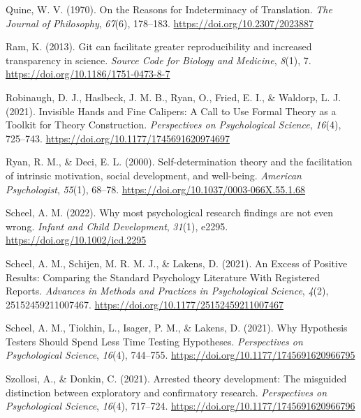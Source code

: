 \documentclass[
  man, noextraspace,floatsintext]{apa6}
\newlength{\cslhangindent}
\newenvironment{CSLReferences}[2] %
 {\begin{list}{}{%
  \setlength{\itemindent}{0pt}
  \setlength{\leftmargin}{0pt}
  \setlength{\parsep}{0pt}
  \ifodd #1
   \setlength{\leftmargin}{\cslhangindent}
   \setlength{\itemindent}{-1\cslhangindent}
  \fi
  \setlength{\itemsep}{#2\baselineskip}}}
 {\end{list}}
\begin{document}
\begin{CSLReferences}{1}{0}
Quine, W. V. (1970). On the {Reasons} for {Indeterminacy} of {Translation}. \emph{The Journal of Philosophy}, \emph{67}(6), 178--183. \url{https://doi.org/10.2307/2023887}

Ram, K. (2013). Git can facilitate greater reproducibility and increased transparency in science. \emph{Source Code for Biology and Medicine}, \emph{8}(1), 7. \url{https://doi.org/10.1186/1751-0473-8-7}

Robinaugh, D. J., Haslbeck, J. M. B., Ryan, O., Fried, E. I., \& Waldorp, L. J. (2021). Invisible {Hands} and {Fine Calipers}: {A Call} to {Use Formal Theory} as a {Toolkit} for {Theory Construction}. \emph{Perspectives on Psychological Science}, \emph{16}(4), 725--743. \url{https://doi.org/10.1177/1745691620974697}

Ryan, R. M., \& Deci, E. L. (2000). Self-determination theory and the facilitation of intrinsic motivation, social development, and well-being. \emph{American Psychologist}, \emph{55}(1), 68--78. \url{https://doi.org/10.1037/0003-066X.55.1.68}

Scheel, A. M. (2022). Why most psychological research findings are not even wrong. \emph{Infant and Child Development}, \emph{31}(1), e2295. \url{https://doi.org/10.1002/icd.2295}

Scheel, A. M., Schijen, M. R. M. J., \& Lakens, D. (2021). An {Excess} of {Positive Results}: {Comparing} the {Standard Psychology Literature With Registered Reports}. \emph{Advances in Methods and Practices in Psychological Science}, \emph{4}(2), 25152459211007467. \url{https://doi.org/10.1177/25152459211007467}

Scheel, A. M., Tiokhin, L., Isager, P. M., \& Lakens, D. (2021). Why {Hypothesis Testers Should Spend Less Time Testing Hypotheses}. \emph{Perspectives on Psychological Science}, \emph{16}(4), 744--755. \url{https://doi.org/10.1177/1745691620966795}

Szollosi, A., \& Donkin, C. (2021). Arrested theory development: {The} misguided distinction between exploratory and confirmatory research. \emph{Perspectives on Psychological Science}, \emph{16}(4), 717--724. \url{https://doi.org/10.1177/1745691620966796}


\end{CSLReferences}
\end{document}
